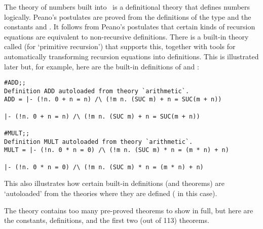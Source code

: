 \newpage %

The theory of numbers built into \HOL\ is a definitional theory that defines
numbers logically. Peano's postulates are proved from the definitions of
the type  and the constants  and .
It follows from Peano's postulates that certain kinds of recursion equations are
equivalent to non-recursive definitions. There is a built-in theory called
 (for `primitive recursion') that supports this,
together with tools for automatically transforming recursion equations into
definitions. This is illustrated later but, for example, here are the built-in
definitions of \ml{+} and \ml{*}:

\begin{session}\begin{verbatim}
#ADD;;
Definition ADD autoloaded from theory `arithmetic`.
ADD = |- (!n. 0 + n = n) /\ (!m n. (SUC m) + n = SUC(m + n))

|- (!n. 0 + n = n) /\ (!m n. (SUC m) + n = SUC(m + n))

#MULT;;
Definition MULT autoloaded from theory `arithmetic`.
MULT = |- (!n. 0 * n = 0) /\ (!m n. (SUC m) * n = (m * n) + n)

|- (!n. 0 * n = 0) /\ (!m n. (SUC m) * n = (m * n) + n)
\end{verbatim}\end{session}

\noindent This also illustrates how certain built-in definitions (and theorems)
are `autoloaded' from the theories where they are defined ( in this
case).

\newpage %

The theory   contains  too many  pre-proved theorems  to show in
full, but  here are  the constants,  definitions, and  the first  two (out of
113) theorems.

